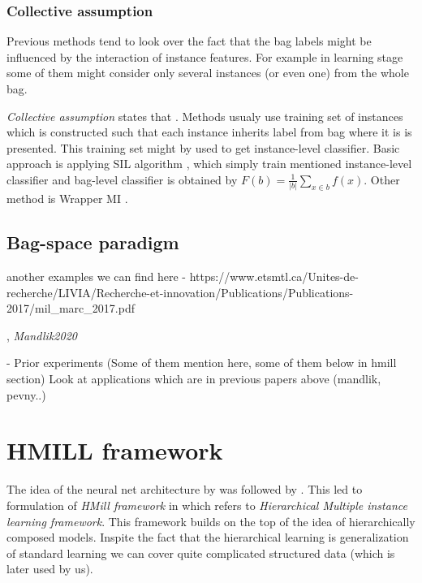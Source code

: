 \subsubsection{Collective assumption}
Previous methods tend to look over the fact that the bag labels might be influenced by the interaction of instance features. For example in learning stage some of them might consider only several instances (or even one) from the whole bag.

\emph{Collective assumption} states that  \cite{Xu2003}. Methods usualy use training set of instances which is constructed such that each instance inherits label from bag where it is is presented. This training set might by used to get instance-level classifier. Basic approach is applying SIL algorithm \cite{Bunescu2007}, which simply train mentioned instance-level classifier and bag-level classifier is obtained by $F(b)=\frac{1}{|b|}\sum_{x\in b}f(x)$. Other method is Wrapper MI \cite{Frank2003}.


\subsection{Bag-space paradigm}

another examples we can find here - https://www.etsmtl.ca/Unites-de-recherche/LIVIA/Recherche-et-innovation/Publications/Publications-2017/mil_marc_2017.pdf


, \emph{Mandlik2020}  \cite{Pevny2016a} \cite{Pevny2017} \cite{PevnyDedic2020}
 \cite{Zaheer2018}

- Prior experiments (Some of them mention here, some of them below in hmill section)
    Look at applications which are in previous papers above (mandlik, pevny..)
        \cite{Stiborek2018}
        \cite{Janisch2020}
        \cite{PevnyDedic2020}
        \cite{PevnyKovarik2019a}
        \cite{Zaheer2018}

\section{HMILL framework}
The idea of the neural net architecture by  was followed by . This led to formulation of \emph{HMill framework} in \cite{Mandlik2020} which refers to \emph{Hierarchical Multiple instance learning framework}. This framework builds on the top of the idea of hierarchically composed models. Inspite the fact that the hierarchical learning is generalization of standard learning we can cover quite complicated structured data (which is later used by us).

